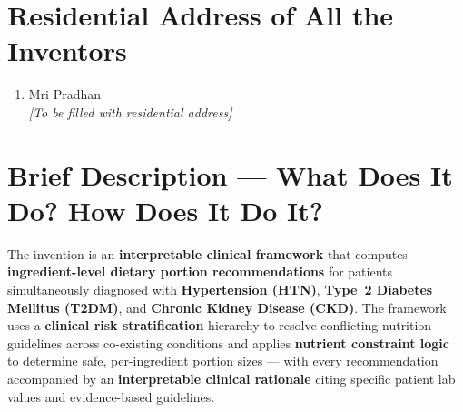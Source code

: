 \documentclass[a4paper,12pt]{article}
\begin{document}
\section*{Residential Address of All the Inventors}

\begin{enumerate}
    \item Mri Pradhan \\
    \textit{[To be filled with residential address]}
\end{enumerate}

\section*{Brief Description --- What Does It Do? How Does It Do It?}

The invention is an \textbf{interpretable clinical framework} that computes \textbf{ingredient-level dietary portion recommendations} for patients simultaneously diagnosed with \textbf{Hypertension (HTN)}, \textbf{Type~2 Diabetes Mellitus (T2DM)}, and \textbf{Chronic Kidney Disease (CKD)}. The framework uses a \textbf{clinical risk stratification} hierarchy to resolve conflicting nutrition guidelines across co-existing conditions and applies \textbf{nutrient constraint logic} to determine safe, per-ingredient portion sizes --- with every recommendation accompanied by an \textbf{interpretable clinical rationale} citing specific patient lab values and evidence-based guidelines.
\end{document}
